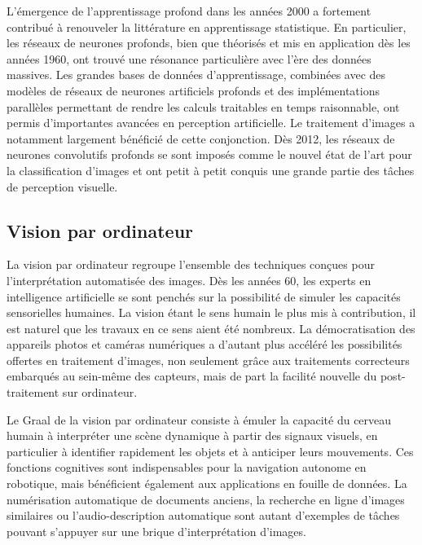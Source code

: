 L'émergence de l'apprentissage profond dans les années 2000 a fortement contribué à renouveler la littérature en apprentissage statistique. En particulier, les réseaux de neurones profonds, bien que théorisés et mis en application dès les années 1960, ont trouvé une résonance particulière avec l'ère des données massives. Les grandes bases de données d'apprentissage, combinées avec des modèles de réseaux de neurones artificiels profonds et des implémentations parallèles permettant de rendre les calculs traitables en temps raisonnable, ont permis d'importantes avancées en perception artificielle. Le traitement d'images a notamment largement bénéficié de cette conjonction. Dès 2012, les réseaux de neurones convolutifs profonds se sont imposés comme le nouvel état de l'art pour la classification d'images et ont petit à petit conquis une grande partie des tâches de perception visuelle.

\subsection{Vision par ordinateur}

La vision par ordinateur regroupe l'ensemble des techniques conçues pour l'interprétation automatisée des images. Dès les années 60, les experts en intelligence artificielle se sont penchés sur la possibilité de simuler les capacités sensorielles humaines. La vision étant le sens humain le plus mis à contribution, il est naturel que les travaux en ce sens aient été nombreux. La démocratisation des appareils photos et caméras numériques a d'autant plus accéléré les possibilités offertes en traitement d'images, non seulement grâce aux traitements correcteurs embarqués au sein-même des capteurs, mais de part la facilité nouvelle du post-traitement sur ordinateur.

Le Graal de la vision par ordinateur consiste à émuler la capacité du cerveau humain à interpréter une scène dynamique à partir des signaux visuels, en particulier à identifier rapidement les objets et à anticiper leurs mouvements. Ces fonctions cognitives sont indispensables pour la navigation autonome en robotique, mais bénéficient également aux applications en fouille de données. La numérisation automatique de documents anciens, la recherche en ligne d'images similaires ou l'audio-description automatique sont autant d'exemples de tâches pouvant s'appuyer sur une brique d'interprétation d'images.


